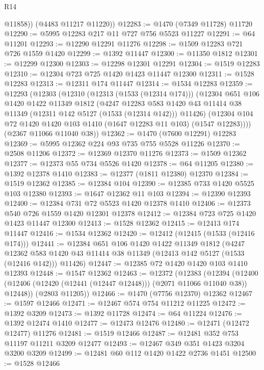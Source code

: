 \begin{lexlean}{R14}
\begin{coremodule}
          @11858))
      (@4483 @11217 @11220))
@12283 := @1470 (@7349 @11728) @11720
@12290 := @5995 @12283 @217 @11 @727 @756 @5523 @11227
@12291 := @64 @11201
@12293 := @12290 @12291 @11276
@12298 := @1509 @12283 @721 @726 @1559 @1420
@12299 := @1392 @11447
@12300 := @11350 @1812
@12301 := @12299 @12300
@12303 := @12298 @12301 @12291
@12304 := @1519 @12283
@12310 := @12304 @723 @725 @1420 @1423 @11447 @12300
@12311 := @1528 @12283
@12313 := @12311 @174 @11447
@12314 := @1534 @12283
@12359 := @12293
    (@12303
      (@12310
        (@12313 (@1533 (@12314 @174)))
        (@12304
          @651
          @106
          @1420
          @1422
          @11349
          @1812
          (@4247
            @12283
            @583
            @1420
            @43
            @11414
            @38
            @11349
            (@12311 @142 @5127 (@1533 (@12314 @142)))
            @11426)
          (@12304 @104 @72 @1420 @1420 @103 @1410 (@1647 @12283 @11 @103) (@1547 @12283))))
      (@2367 @11066 @11040 @38))
@12362 := @1470 (@7600 @12291) @12283
@12369 := @5995 @12362 @224 @93 @735 @755 @5528 @11226
@12370 := @2508 @11206
@12372 := @12369 @12370 @11276
@12373 := @1509 @12362
@12377 := @12373 @55 @734 @5526 @1420
@12378 := @64 @11205
@12380 := @1392 @12378 @1410
@12383 := @12377 (@1811 @12380) @12370
@12384 := @1519 @12362
@12385 := @12384 @104
@12390 := @12385 @733 @1420 @5525 @103 @12380
@12393 := @1647 @12362 @11 @103
@12394 := @12390 @12393
@12400 := @12384 @731 @72 @5523 @1420 @12378 @1410
@12406 := @12373 @540 @726 @1559 @1420 @12301 @12378
@12412 := @12384 @723 @725 @1420 @1423 @11447 @12300
@12413 := @1528 @12362
@12415 := @12413 @174 @11447
@12416 := @1534 @12362
@12420 := @12412 (@12415 (@1533 (@12416 @174)))
@12441 := @12384
    @651
    @106
    @1420
    @1422
    @11349
    @1812
    (@4247 @12362 @583 @1420 @43 @11414 @38 @11349 (@12413 @142 @5127 (@1533 (@12416 @142))) @11426)
@12447 := @12385 @72 @1420 @1420 @103 @1410 @12393
@12448 := @1547 @12362
@12463 := @12372
    (@12383
      (@12394 (@12400 (@12406 (@12420 (@12441 (@12447 @12448))) (@2071 @11066 @11040 @38)) @12448))
      (@2803 @11205))
@12466 := @1470 (@7756 @12370) @12362
@12467 := @1597 @12466
@12471 := @12467 @574 @754 @11212 @11225
@12472 := @1392 @3209
@12473 := @1392 @11728
@12474 := @64 @11224
@12476 := @1392 @12474 @1410
@12477 := @12473 @12476
@12480 := @12471 (@12472 @12477) @11276
@12481 := @1519 @12466
@12487 := @12481 @352 @753 @11197 @11211 @3209 @12477
@12493 := @12467 @349 @351 @1423 @3204 @3200 @3209
@12499 := @12481 @60 @112 @1420 @1422 @2736 @1451
@12500 := @1528 @12466

\end{coremodule}
\end{lexlean}
